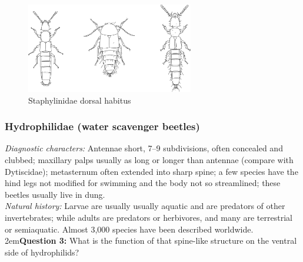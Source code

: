\documentclass[letterpaper, 11pt]{article}
\begin{document}
\begin{figure}[ht!]
  \centering
    \includegraphics[width=0.65\textwidth]{staphylinids.png}
  \caption{Staphylinidae dorsal habitus \citep[][Plate I]{bhlitem132642}}
  \label{fig:staphylinids}
\end{figure}

\subsubsection{Hydrophilidae (water scavenger beetles)}
\noindent{}\textit{Diagnostic characters:} Antennae short, 7--9 subdivisions, often concealed and clubbed; maxillary palps usually as long or longer than antennae (compare with Dytiscidae); metasternum often extended into sharp spine; a few species have the hind legs not modified for swimming and the body not so streamlined; these beetles usually live in dung.\\

\noindent{}\textit{Natural history:} Larvae are usually usually aquatic and are predators of other invertebrates; while adults are predators or herbivores, and many are terrestrial or semiaquatic. Almost 3,000 species have been described worldwide.\\

\hangindent2em\textbf{Question 3:} What is the function of that spine-like structure on the ventral side of hydrophilids?\\
\end{document}
